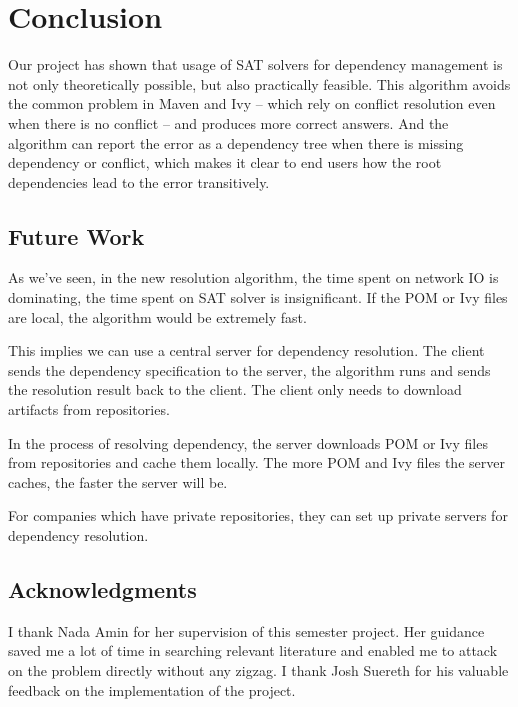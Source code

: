 \section{Conclusion}

Our project has shown that usage of SAT solvers for dependency management is not only theoretically possible, but also practically feasible. This algorithm avoids the common problem in Maven and Ivy -- which rely on conflict resolution even when there is no conflict -- and produces more correct answers. And the algorithm can report the error as a dependency tree when there is missing dependency or conflict, which makes it clear to end users how the root dependencies lead to the error transitively.


\subsection{Future Work}

As we've seen, in the new resolution algorithm, the time spent on network IO is dominating, the time spent on SAT solver is insignificant. If the POM or Ivy files are local, the algorithm would be extremely fast.

This implies we can use a central server for dependency resolution. The client sends the dependency specification to the server, the algorithm runs and sends the resolution result back to the client. The client only needs to download artifacts from repositories.

In the process of resolving dependency, the server downloads POM or Ivy files from repositories and cache them locally. The more POM and Ivy files the server caches, the faster the server will be.

For companies which have private repositories, they can set up private servers for dependency resolution.

\subsection{Acknowledgments}

I thank Nada Amin for her supervision of this semester project. Her guidance saved me a lot of time in searching relevant literature and enabled me to attack on the problem directly without any zigzag. I thank Josh Suereth for his valuable feedback on the implementation of the project.
